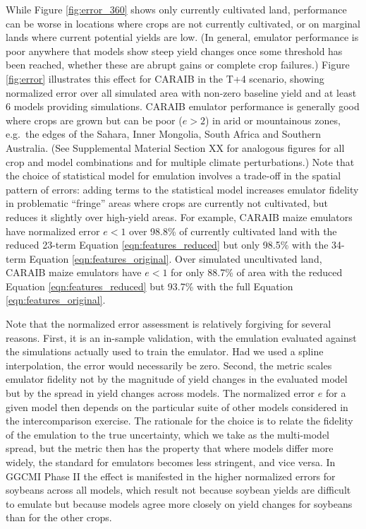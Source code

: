 \documentclass[gmd, manuscript]{copernicus} %
\begin{document}
While Figure \ref{fig:error_360} shows only currently cultivated land, performance can be worse in locations where crops are not currently cultivated, or on marginal lands where current potential yields are low. (In general, emulator performance is poor anywhere that models show steep yield changes once some threshold has been reached, whether these are abrupt gains or complete crop failures.) 
Figure \ref{fig:error} illustrates this effect for CARAIB in the T+4 scenario, showing normalized error over all simulated area with non-zero baseline yield and at least 6 models providing simulations. CARAIB emulator performance is generally good where crops are grown but can be poor ($e > 2$) in arid or mountainous zones, e.g.\ the edges of the Sahara, Inner Mongolia, South Africa and Southern Australia. (See Supplemental Material Section XX for analogous figures for all crop and model combinations and for multiple climate perturbations.)
Note that the choice of statistical model for emulation involves a trade-off in the spatial pattern of errors: adding terms to the statistical model increases emulator fidelity in problematic ``fringe'' areas where crops are currently not cultivated, but reduces it slightly over high-yield areas.
For example, CARAIB maize emulators have normalized error $e < 1$ over 98.8\% of currently cultivated land with the reduced 23-term Equation \ref{eqn:features_reduced} but only 98.5\% with the 34-term Equation \ref{eqn:features_original}. 
Over simulated uncultivated land, CARAIB maize emulators have $e < 1$ for only 88.7\% of area with the reduced Equation \ref{eqn:features_reduced} but 93.7\% with the full Equation \ref{eqn:features_original}. 

Note that the normalized error assessment is relatively forgiving for several reasons. 
First, it is an in-sample validation, with the emulation evaluated against the simulations actually used to train the emulator. 
Had we used a spline interpolation, the error would necessarily be zero. 
Second, the metric scales emulator fidelity not by the magnitude of yield changes in the evaluated model but by the spread in yield changes across models. 
The normalized error $e$ for a given model then depends on the particular suite of other models considered in the intercomparison exercise.  
The rationale for the choice is to relate the fidelity of the emulation to the true uncertainty, which we take as the multi-model spread, but  
the metric then has the property that where models differ more widely, the standard for emulators becomes less stringent, and vice versa.
In GGCMI Phase II the effect is manifested in the higher normalized errors for soybeans across all models, which result not because soybean yields are difficult to emulate but because models agree more closely on yield changes for soybeans than for the other crops.
\end{document}
